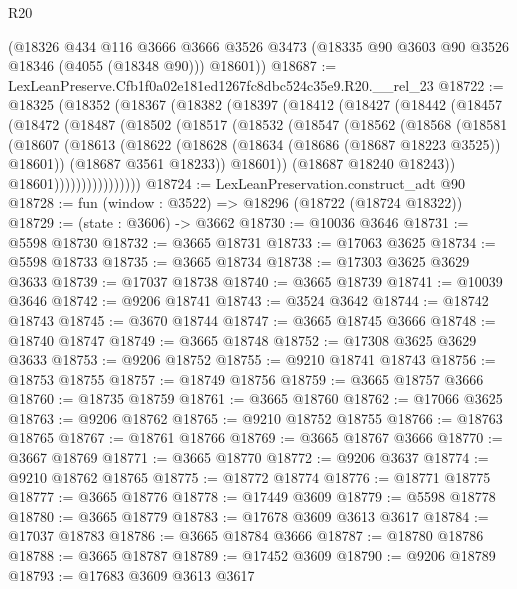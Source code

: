 \begin{lexlean}{R20}
\begin{coremodule}
      (@18326
        @434
        @116
        @3666
        @3666
        @3526
        @3473
        (@18335 @90 @3603 @90 @3526 @18346 (@4055 (@18348 @90)))
        @18601))
@18687 := LexLeanPreserve.Cfb1f0a02e181ed1267fc8dbc524c35e9.R20.__rel_23
@18722 := @18325
    (@18352
      (@18367
        (@18382
          (@18397
            (@18412
              (@18427
                (@18442
                  (@18457
                    (@18472
                      (@18487
                        (@18502
                          (@18517
                            (@18532
                              (@18547
                                (@18562
                                  (@18568
                                    (@18581
                                      (@18607
                                        (@18613
                                          (@18622
                                            (@18628 (@18634 (@18686 (@18687 @18223 @3525)) @18601))
                                            (@18687 @3561 @18233))
                                          @18601))
                                      (@18687 @18240 @18243))
                                    @18601))))))))))))))))
@18724 := LexLeanPreservation.construct_adt @90
@18728 := fun (window : @3522) => @18296 (@18722 (@18724 @18322))
@18729 := (state : @3606) -> @3662
@18730 := @10036 @3646
@18731 := @5598 @18730
@18732 := @3665 @18731
@18733 := @17063 @3625
@18734 := @5598 @18733
@18735 := @3665 @18734
@18738 := @17303 @3625 @3629 @3633
@18739 := @17037 @18738
@18740 := @3665 @18739
@18741 := @10039 @3646
@18742 := @9206 @18741
@18743 := @3524 @3642
@18744 := @18742 @18743
@18745 := @3670 @18744
@18747 := @3665 @18745 @3666
@18748 := @18740 @18747
@18749 := @3665 @18748
@18752 := @17308 @3625 @3629 @3633
@18753 := @9206 @18752
@18755 := @9210 @18741 @18743
@18756 := @18753 @18755
@18757 := @18749 @18756
@18759 := @3665 @18757 @3666
@18760 := @18735 @18759
@18761 := @3665 @18760
@18762 := @17066 @3625
@18763 := @9206 @18762
@18765 := @9210 @18752 @18755
@18766 := @18763 @18765
@18767 := @18761 @18766
@18769 := @3665 @18767 @3666
@18770 := @3667 @18769
@18771 := @3665 @18770
@18772 := @9206 @3637
@18774 := @9210 @18762 @18765
@18775 := @18772 @18774
@18776 := @18771 @18775
@18777 := @3665 @18776
@18778 := @17449 @3609
@18779 := @5598 @18778
@18780 := @3665 @18779
@18783 := @17678 @3609 @3613 @3617
@18784 := @17037 @18783
@18786 := @3665 @18784 @3666
@18787 := @18780 @18786
@18788 := @3665 @18787
@18789 := @17452 @3609
@18790 := @9206 @18789
@18793 := @17683 @3609 @3613 @3617

\end{coremodule}
\end{lexlean}
